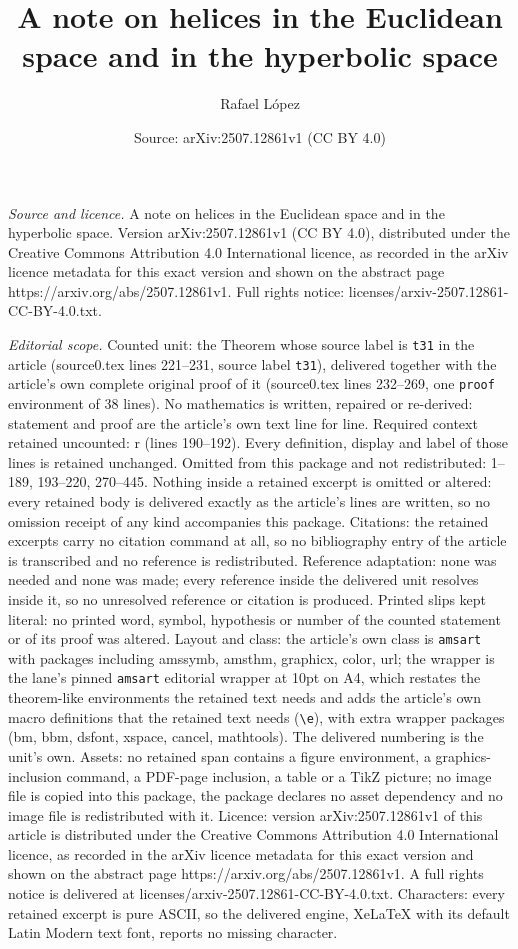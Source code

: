 \documentclass[10pt,a4paper]{amsart}
\title[A note on helices in the Euclidean space and in the hyperbol]{A note on helices in the Euclidean space and in the hyperbolic space}
\author{Rafael L\'opez}
\date{Source: arXiv:2507.12861v1 (CC BY 4.0)}
\begin{document}
\maketitle

\noindent\emph{Source and licence.} A note on helices in the Euclidean space and in the hyperbolic space. Version arXiv:2507.12861v1 (CC BY 4.0), distributed under the Creative Commons Attribution 4.0 International licence, as recorded in the arXiv licence metadata for this exact version and shown on the abstract page https://arxiv.org/abs/2507.12861v1. Full rights notice: licenses/arxiv-2507.12861-CC-BY-4.0.txt.\par\smallskip

\noindent\textit{Editorial scope.} Counted unit: the Theorem whose source label is \texttt{t31} in the article (source0.tex lines 221--231, source label \texttt{t31}), delivered together with the article's own complete original proof of it (source0.tex lines 232--269, one \texttt{proof} environment of 38 lines). No mathematics is written, repaired or re-derived: statement and proof are the article's own text line for line. Required context retained uncounted: r (lines 190--192). Every definition, display and label of those lines is retained unchanged. Omitted from this package and not redistributed: 1--189, 193--220, 270--445. Nothing inside a retained excerpt is omitted or altered: every retained body is delivered exactly as the article's lines are written, so no omission receipt of any kind accompanies this package. Citations: the retained excerpts carry no citation command at all, so no bibliography entry of the article is transcribed and no reference is redistributed. Reference adaptation: none was needed and none was made; every reference inside the delivered unit resolves inside it, so no unresolved reference or citation is produced. Printed slips kept literal: no printed word, symbol, hypothesis or number of the counted statement or of its proof was altered. Layout and class: the article's own class is \texttt{amsart} with packages including amssymb, amsthm, graphicx, color, url; the wrapper is the lane's pinned \texttt{amsart} editorial wrapper at 10pt on A4, which restates the theorem-like environments the retained text needs and adds the article's own macro definitions that the retained text needs (\texttt{\textbackslash e}), with extra wrapper packages (bm, bbm, dsfont, xspace, cancel, mathtools). The delivered numbering is the unit's own. Assets: no retained span contains a figure environment, a graphics-inclusion command, a PDF-page inclusion, a table or a TikZ picture; no image file is copied into this package, the package declares no asset dependency and no image file is redistributed with it. Licence: version arXiv:2507.12861v1 of this article is distributed under the Creative Commons Attribution 4.0 International licence, as recorded in the arXiv licence metadata for this exact version and shown on the abstract page https://arxiv.org/abs/2507.12861v1. A full rights notice is delivered at licenses/arxiv-2507.12861-CC-BY-4.0.txt. Characters: every retained excerpt is pure ASCII, so the delivered engine, XeLaTeX with its default Latin Modern text font, reports no missing character.
\end{document}
